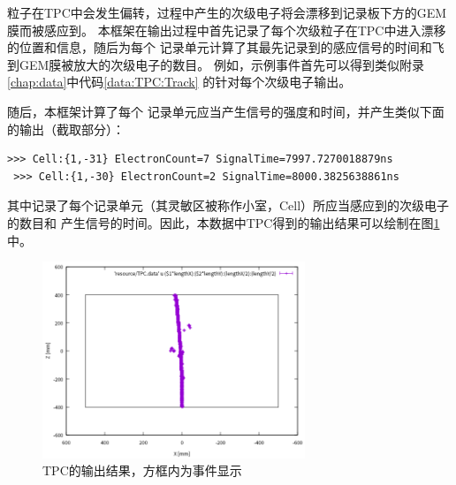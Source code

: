 \documentclass[bachelor,openany,oneside,color]{buaathesis}
\begin{document}
粒子在TPC中会发生偏转，过程中产生的次级电子将会漂移到记录板下方的GEM膜而被感应到。
本框架在输出过程中首先记录了每个次级粒子在TPC中进入漂移的位置和信息，随后为每个
记录单元计算了其最先记录到的感应信号的时间和飞到GEM膜被放大的次级电子的数目。
例如，示例事件首先可以得到类似附录\ref{chap:data}中代码\ref{data:TPC:Track}
的针对每个次级电子输出。

随后，本框架计算了每个
记录单元应当产生信号的强度和时间，并产生类似下面的输出（截取部分）：

\begin{lstlisting}[caption={TPC Cells},firstnumber=3384,lastline=3387]
 >>> Cell:{1,-31} ElectronCount=7 SignalTime=7997.7270018879ns
 >>> Cell:{1,-30} ElectronCount=2 SignalTime=8000.3825638861ns
\end{lstlisting}

其中记录了每个记录单元（其灵敏区被称作小室，Cell）所应当感应到的次级电子的数目和
产生信号的时间。因此，本数据中TPC得到的输出结果可以绘制在图\ref{fig:result:TPC}中。

\begin{figure}
	\centering
	\includegraphics[width=0.7\textwidth]{./resource/TPC-result.png}
	\caption{TPC的输出结果，方框内为事件显示}\label{fig:result:TPC}
\end{figure}
\end{document}
